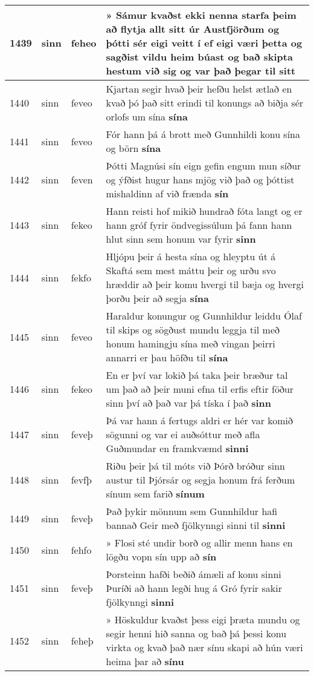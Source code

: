 \documentclass{article}
\begin{document}
\begin{longtable}{p{1cm}|p{1cm}|p{1cm}|p{13cm}}
\hline
1439&sinn&feheo&» Sámur kvaðst ekki nenna starfa þeim að flytja allt sitt úr Austfjörðum og þótti sér eigi veitt í ef eigi væri þetta og sagðist vildu heim búast og bað skipta hestum við sig og var það þegar til \textbf{sitt} \\
\hline
1440&sinn&feveo&Kjartan segir hvað þeir hefðu helst ætlað en kvað þó það sitt erindi til konungs að biðja sér orlofs um sína \textbf{sína} \\
\hline
1441&sinn&feveo&Fór hann þá á brott með Gunnhildi konu sína og börn \textbf{sína} \\
\hline
1442&sinn&feven&Þótti Magnúsi sín eign gefin engum mun síður og ýfðist hugur hans mjög við það og þóttist mishaldinn af við frænda \textbf{sín} \\
\hline
1443&sinn&fekeo&Hann reisti hof mikið hundrað fóta langt og er hann gróf fyrir öndvegissúlum þá fann hann hlut sinn sem honum var fyrir \textbf{sinn} \\
\hline
1444&sinn&fekfo&Hljópu þeir á hesta sína og hleyptu út á Skaftá sem mest máttu þeir og urðu svo hræddir að þeir komu hvergi til bæja og hvergi þorðu þeir að segja \textbf{sína} \\
\hline
1445&sinn&feveo&Haraldur konungur og Gunnhildur leiddu Ólaf til skips og sögðust mundu leggja til með honum hamingju sína með vingan þeirri annarri er þau höfðu til \textbf{sína} \\
\hline
1446&sinn&fekeo&En er því var lokið þá taka þeir bræður tal um það að þeir muni efna til erfis eftir föður sinn því að það var þá tíska í það \textbf{sinn} \\
\hline
1447&sinn&feveþ&Þá var hann á fertugs aldri er hér var komið sögunni og var ei auðsóttur með afla Guðmundar en framkvæmd \textbf{sinni} \\
\hline
1448&sinn&fevfþ&Riðu þeir þá til móts við Þórð bróður sinn austur til Þjórsár og segja honum frá ferðum sínum sem farið \textbf{sínum} \\
\hline
1449&sinn&feveþ&Það þykir mönnum sem Gunnhildur hafi bannað Geir með fjölkynngi sinni til \textbf{sinni} \\
\hline
1450&sinn&fehfo&» Flosi sté undir borð og allir menn hans en lögðu vopn sín upp að \textbf{sín} \\
\hline
1451&sinn&feveþ&Þorsteinn hafði beðið ámæli af konu sinni Þuríði að hann legði hug á Gró fyrir sakir fjölkynngi \textbf{sinni} \\
\hline
1452&sinn&feheþ&» Höskuldur kvaðst þess eigi þræta mundu og segir henni hið sanna og bað þá þessi konu virkta og kvað það nær sínu skapi að hún væri heima þar að \textbf{sínu} \\

\end{longtable}
\end{document}
